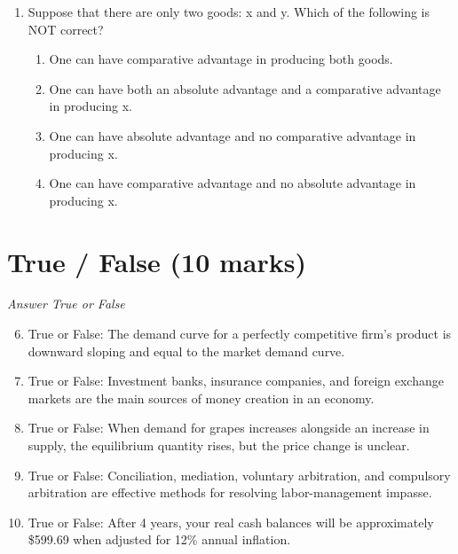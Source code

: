 \documentclass[12pt]{article}
\begin{document}
\begin{enumerate}[label=\arabic*.]
\begin{enumerate}[label=(\alph*)]
    \item decrease by \$200 million.
    \item decrease by \$100 million.
    \item increase by \$200 million.
    \item decrease by \$10 million.
    \item increase by \$500 million.
\end{enumerate}
\item Suppose that there are only two goods: x and y. Which of the following is NOT correct?
\begin{enumerate}[label=(\alph*)]
    \item One can have comparative advantage in producing both goods.
    \item One can have both an absolute advantage and a comparative advantage in producing x.
    \item One can have absolute advantage and no comparative advantage in producing x.
    \item One can have comparative advantage and no absolute advantage in producing x.
\end{enumerate}
\end{enumerate}

\section*{True / False (10 marks)}
\textit{Answer True or False}
\begin{enumerate}[label=\arabic*.]
\setcounter{enumi}{5}
\item True or False: The demand curve for a perfectly competitive firm's product is downward sloping and equal to the market demand curve.
\item True or False: Investment banks, insurance companies, and foreign exchange markets are the main sources of money creation in an economy.
\item True or False: When demand for grapes increases alongside an increase in supply, the equilibrium quantity rises, but the price change is unclear.
\item True or False: Conciliation, mediation, voluntary arbitration, and compulsory arbitration are effective methods for resolving labor-management impasse.
\item True or False: After 4 years, your real cash balances will be approximately \$599.69 when adjusted for 12\% annual inflation.
\end{enumerate}
\end{document}
